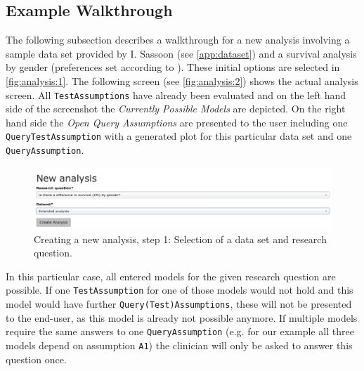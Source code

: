 \subsection{Example Walkthrough}
\label{sub:walk}

The following subsection describes a walkthrough for a new analysis involving a sample data set provided by I. Sassoon (see \autoref{app:dataset}) and a survival analysis by gender (preferences set according to \cite{sassoon2016CD}). These initial options are selected in \autoref{fig:analysis:1}. The following screen (see \autoref{fig:analysis:2}) shows the actual analysis screen. All \texttt{TestAssumptions} have already been evaluated and on the left hand side of the screenshot the \textit{Currently Possible Models} are depicted. On the right hand side the \textit{Open Query Assumptions} are presented to the user including one \texttt{QueryTestAssumption} with a generated plot for this particular data set and one \texttt{QueryAssumption}. 

\begin{figure}[b]
	\centering
	\includegraphics[width=\textwidth]{figures/ui_analysis_0}
	\caption{Creating a new analysis, step 1: Selection of a data set and research question. }
	\label{fig:analysis:1}
\end{figure}

In this particular case, all entered models for the given research question are possible. If one \texttt{TestAssumption} for one of those models would not hold and this model would have further \texttt{Query(Test)Assumptions}, these will not be presented to the end-user, as this model is already not possible anymore. If multiple models require the same answers to one \texttt{QueryAssumption} (e.g. for our example all three models depend on assumption \texttt{A1}) the clinician will only be asked to answer this question once. 

